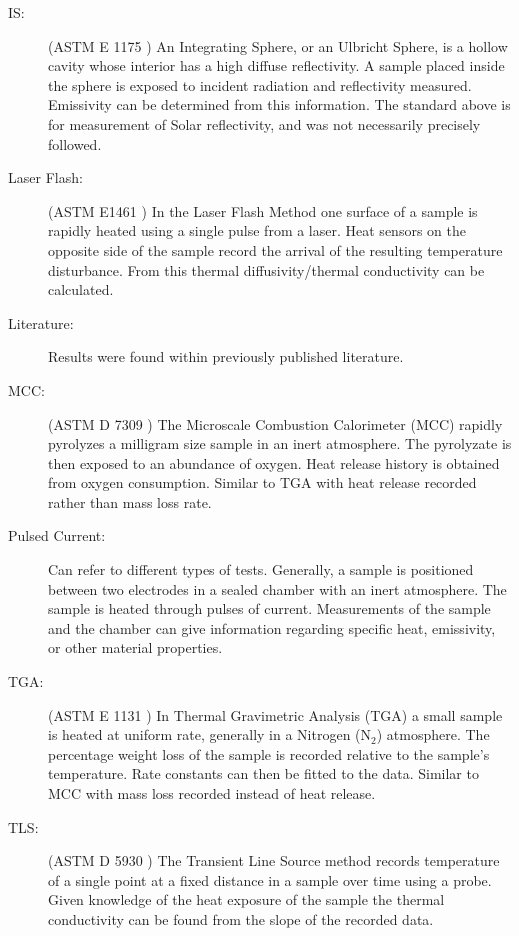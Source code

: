 \begin{description}
\item[IS:] (ASTM E 1175 \cite{intgsphere}) An Integrating Sphere, or an Ulbricht Sphere, is a hollow cavity whose interior has a high diffuse reflectivity. A sample placed inside the sphere is exposed to incident radiation and reflectivity measured. Emissivity can be determined from this information. The standard above is for measurement of Solar reflectivity, and was not necessarily precisely followed.
\item[Laser Flash:] (ASTM E1461 \cite{laserflash}) In the Laser Flash Method one surface of a sample is rapidly heated using a single pulse from a laser. Heat sensors on the opposite side of the sample record the arrival of the resulting temperature disturbance. From this thermal diffusivity/thermal conductivity can be calculated.
\item[Literature:] Results were found within previously published literature.
\item[MCC:] (ASTM D 7309 \cite{microcc}) The Microscale Combustion Calorimeter (MCC)  rapidly pyrolyzes a milligram size sample in an inert atmosphere. The pyrolyzate is then exposed to an abundance of oxygen.  Heat release history is obtained from oxygen consumption. Similar to TGA with  heat release recorded rather than mass loss rate.
\item[Pulsed Current:] Can refer to different types of tests. Generally, a sample is positioned between two electrodes in a sealed chamber with an inert atmosphere. The sample is heated through pulses of current. Measurements of the sample and the chamber can give information regarding specific heat, emissivity, or other material properties.
\item[TGA:] (ASTM E 1131 \cite{thermalga}) In Thermal Gravimetric Analysis (TGA)  a small sample is heated at uniform rate, generally in a Nitrogen (N$_2$) atmosphere. The percentage weight loss of the sample is recorded relative to the sample's temperature. Rate constants can then be fitted to the data. Similar to MCC with mass loss recorded instead of heat release.
\item[TLS:] (ASTM D 5930 \cite{transline}) The Transient Line Source method records temperature of a single point at a fixed distance in a sample over time using a probe. Given knowledge of the heat exposure of the sample the thermal conductivity can be found from the slope of the recorded data.
\end{description}



\newpage

